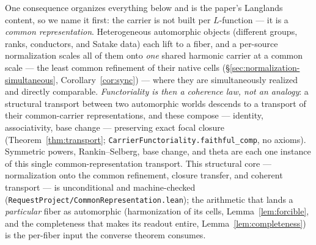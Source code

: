 \documentclass[11pt]{article}
\theoremstyle{definition}
\begin{document}
One consequence organizes everything below and is the paper's Langlands
content, so we name it first: the carrier is not built per $L$-function --- it
is a \emph{common representation}. Heterogeneous automorphic objects
(different groups, ranks, conductors, and Satake data) each lift to a fiber,
and a per-source normalization scales all of them onto \emph{one} shared
harmonic carrier at a common scale --- the least common refinement of their
native cells (\S\ref{sec:normalization-simultaneous},
Corollary~\ref{cor:sync}) --- where they are simultaneously realized and
directly comparable. \emph{Functoriality is then a coherence law, not an
analogy}: a structural transport between two automorphic worlds descends to a
transport of their common-carrier representations, and these compose ---
identity, associativity, base change --- preserving exact focal closure
(Theorem~\ref{thm:transport}; \texttt{CarrierFunctoriality.faithful\_comp}, no
axioms). Symmetric powers, Rankin--Selberg, base change, and theta are each
one instance of this single common-representation transport. This structural
core --- normalization onto the common refinement, closure transfer, and
coherent transport --- is unconditional and machine-checked
(\texttt{RequestProject/CommonRepresentation.lean}); the arithmetic that lands
a \emph{particular} fiber as automorphic (harmonization of its cells,
Lemma~\ref{lem:forcible}, and the completeness that makes its readout entire,
Lemma~\ref{lem:completeness}) is the per-fiber input the converse theorem
consumes.
\end{document}
